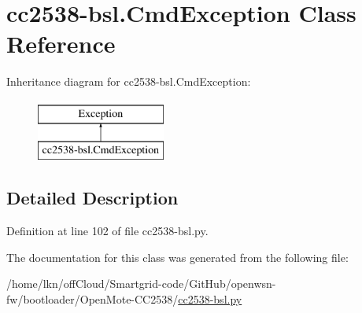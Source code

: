 \hypertarget{classcc2538-bsl_1_1_cmd_exception}{}\section{cc2538-\/bsl.Cmd\+Exception Class Reference}
\label{classcc2538-bsl_1_1_cmd_exception}
Inheritance diagram for cc2538-\/bsl.Cmd\+Exception\+:\begin{figure}[H]
\begin{center}
\leavevmode
\includegraphics[height=2.000000cm]{classcc2538-bsl_1_1_cmd_exception}
\end{center}
\end{figure}


\subsection{Detailed Description}


Definition at line 102 of file cc2538-\/bsl.\+py.



The documentation for this class was generated from the following file\+:\begin{DoxyCompactItemize}
\item 
/home/lkn/off\+Cloud/\+Smartgrid-\/code/\+Git\+Hub/openwsn-\/fw/bootloader/\+Open\+Mote-\/\+C\+C2538/\hyperlink{cc2538-bsl_8py}{cc2538-\/bsl.\+py}\end{DoxyCompactItemize}
